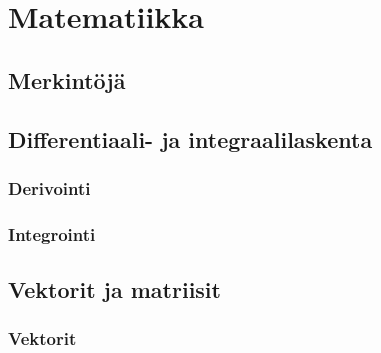 


\part{Matematiikka}

\chapter{Merkintöjä}

\chapter{Differentiaali- ja integraalilaskenta}

\section{Derivointi}

\section{Integrointi}


\chapter{Vektorit ja matriisit}

\section{Vektorit}


